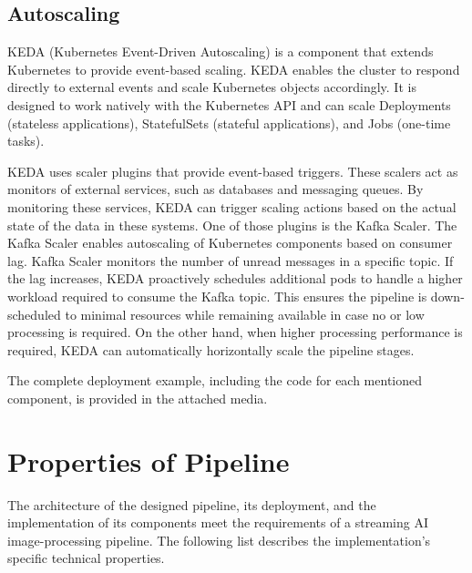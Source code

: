 \subsection{Autoscaling}
KEDA (Kubernetes Event-Driven Autoscaling) is a component that extends Kubernetes to provide event-based scaling. KEDA enables the cluster to respond directly to external events and scale Kubernetes objects accordingly. It is designed to work natively with the Kubernetes API and can scale Deployments (stateless applications), StatefulSets (stateful applications), and Jobs (one-time tasks).

KEDA uses scaler plugins that provide event-based triggers. These scalers act as monitors of external services, such as databases and messaging queues. By monitoring these services, KEDA can trigger scaling actions based on the actual state of the data in these systems. One of those plugins is the Kafka Scaler. The Kafka Scaler enables autoscaling of Kubernetes components based on consumer lag. Kafka Scaler monitors the number of unread messages in a specific topic. If the lag increases, KEDA proactively schedules additional pods to handle a higher workload required to consume the Kafka topic. This ensures the pipeline is down-scheduled to minimal resources while remaining available in case no or low processing is required. On the other hand, when higher processing performance is required, KEDA can automatically horizontally scale the pipeline stages.

\vspace{1.5em}
The complete deployment example, including the code for each mentioned component, is provided in the attached media. 

\section{Properties of Pipeline}
The architecture of the designed pipeline, its deployment, and the implementation of its components meet the requirements of a streaming AI image-processing pipeline. The following list describes the implementation's specific technical properties.

